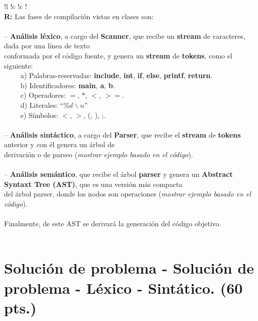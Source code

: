 \documentclass{exam}
\begin{document}
\begin{table}[H]
\begin{tabular}{
    !{\color{gray!50}\vrule}l
    !{\color{gray!50}\vrule}c
    !{\color{gray!50}\vrule}c
    !{\color{gray!50}\vrule}} 
     \hline
    \\
    \textbf{R:} Las fases de compilación vistas en clases son: \\ \\
    -- \textbf{An\'alisis l\'exico}, a cargo del \textbf{Scanner}, que recibe un \textbf{stream} de caracteres, dada por una l\'inea de texto \\ conformada por el c\'odigo fuente, y genera un \textbf{stream} de \textbf{tokens}, como el siguiente: \\
        ~~~~ a) Palabras-reservadas: \textbf{include}, \textbf{int}, \textbf{if}, \textbf{else}, \textbf{printf}, \textbf{return}.\\
        ~~~~ b) Identificadores: \textbf{main}, \textbf{a}, \textbf{b}.\\
        ~~~~ c) Operadores: $=$, $*$, $<$, $>=$.\\
        ~~~~ d) Literales: ``$\% d\backslash n$''\\
        ~~~~ e) S\'imbolos: $<$, $>$, (, ), ;. \\ \\
    -- \textbf{An\'alisis sint\'actico}, a cargo del \textbf{Parser}, que recibe el \textbf{stream} de \textbf{tokens} anterior y con \'el genera un \'arbol de \\ derivaci\'on o de parseo ({\em mostrar ejemplo basado en el c\'odigo}). \\ \\
    -- \textbf{An\'alisis sem\'antico}, que recibe el \'arbol \textbf{parser} y genera un \textbf{Abstract Syntaxt Tree (AST)}, que es una versi\'on m\'as compacta \\ del \'arbol parser, donde los nodos son operaciones ({\em mostrar ejemplo basado en el c\'odigo}). \\ \\
    Finalmente, de este AST se derivar\'a la generaci\'on del c\'odigo objetivo.
    \\ \\  \hline
\end{tabular}
\end{table}

\clearpage

\section{\textbf{Soluci\'on de problema - Soluci\'on de problema - L\'exico - Sint\'atico. (60 pts.)}}
\end{document}
